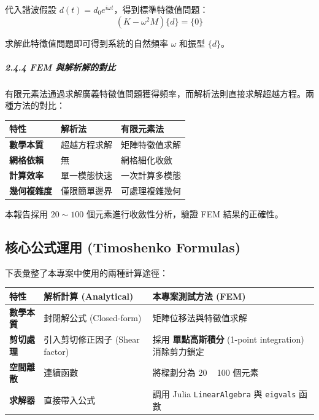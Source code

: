 \documentclass[UTF8, a4paper, 12pt]{ctexart}
\begin{document}
代入諧波假設 $d(t) = d_0 e^{i\omega t}$，得到標準特徵值問題：
\begin{equation}
  (K - \omega^2 M) \{d\} = \{0\}
\end{equation}

求解此特徵值問題即可得到系統的自然頻率 $\omega$ 和振型 $\{d\}$。

\subparagraph{2.4.4 FEM 與解析解的對比}

有限元素法通過求解廣義特徵值問題獲得頻率，而解析法則直接求解超越方程。兩種方法的對比：

\begin{center}
\begin{tabular}{p{3cm}p{5cm}p{5cm}}
\toprule
\textbf{特性} & \textbf{解析法} & \textbf{有限元素法} \\
\midrule
\textbf{數學本質} & 超越方程求解 & 矩陣特徵值求解 \\
\midrule
\textbf{網格依賴} & 無 & 網格細化收斂 \\
\midrule
\textbf{計算效率} & 單一模態快速 & 一次計算多模態 \\
\midrule
\textbf{幾何複雜度} & 僅限簡單邊界 & 可處理複雜幾何 \\
\bottomrule
\end{tabular}
\end{center}

本報告採用 $20\sim100$ 個元素進行收斂性分析，驗證 FEM 結果的正確性。

\subsection{ 核心公式運用 (Timoshenko Formulas)}

下表彙整了本專案中使用的兩種計算途徑：

\begin{center}
\begin{tabular}{p{3cm}p{6cm}p{6cm}}
\toprule
\textbf{特性} & \textbf{解析計算 (Analytical)} & \textbf{本專案測試方法 (FEM)} \\
\midrule
\textbf{數學本質} & 封閉解公式 (Closed-form) & 矩陣位移法與特徵值求解 \\
\midrule
\textbf{剪切處理} & 引入剪切修正因子 (Shear factor) & 採用 \textbf{單點高斯積分} (1-point integration) 消除剪力鎖定 \\
\midrule
  \textbf{空間離散} & 連續函數 & 將樑劃分為 20 ~ 100 個元素  \\
\midrule
\textbf{求解器} & 直接帶入公式 & 調用 Julia \texttt{LinearAlgebra} 與 \texttt{eigvals} 函數 \\
\bottomrule
\end{tabular}
\end{center}
\end{document}
